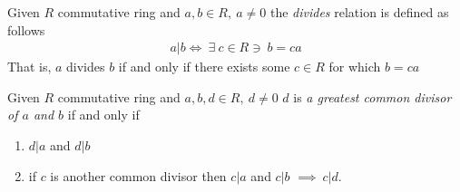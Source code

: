 \begin{definition}
    Given $R$ commutative ring and $a,b\in R, \ a\neq 0$ the \textit{divides} relation is defined as follows
    \begin{align}
        a |b \iff \ \exists \ c\in R \ni \ b=ca \nonumber
    \end{align}
    That is, $a$ divides $b$ if and only if there exists some $c\in R$ for which $b=ca$
\end{definition}
\newpage
\begin{definition}
     Given $R$ commutative ring and $a,b, d \in R, \ d\neq 0$ $d$ is \textit{a greatest common divisor of $a$ and $b$} if and only if 
     \begin{enumerate}
        \item $d|a$ and $d|b$
        \item if $c$ is another common divisor then $c|a$ and $c|b$ $\implies \ c|d$.
     \end{enumerate}
\end{definition}

